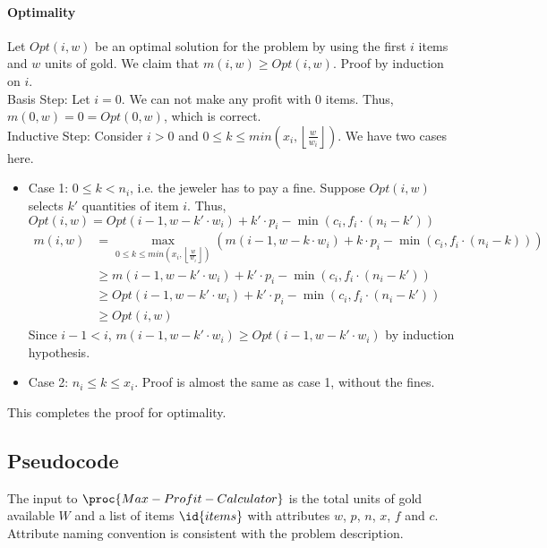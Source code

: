\documentclass{article}
\begin{document}
\paragraph{Optimality}
Let $Opt(i, w)$ be an optimal solution for the problem by using the first $i$ items and $w$ units of gold. We claim that $m(i, w) \geq Opt(i, w)$. Proof by induction on $i$.\\
Basis Step: Let $i = 0$. We can not make any profit with 0 items. Thus, $m(0, w) = 0 = Opt(0, w)$, which is correct.\\
Inductive Step: Consider $i > 0$ and $0 \leq k \leq min\left(x_i, \left\lfloor\frac{w}{w_i}\right\rfloor\right)$. We have two cases here.
\begin{itemize}
	\item Case 1: $0 \leq k < n_i$, i.e. the jeweler has to pay a fine. Suppose $Opt(i, w)$ selects $k'$ quantities of item $i$. Thus, $Opt(i, w) = Opt(i-1, w-k' \cdot w_i) + k' \cdot p_i - \min(c_i, f_i \cdot(n_i - k'))$
	\begin{align*}
	m(i, w) &= \max\limits_{0 \leq k \leq min\left(x_i, \left\lfloor\frac{w}{w_i}\right\rfloor\right)}(m(i-1, w-k \cdot w_i) + k \cdot p_i - \min(c_i, f_i \cdot(n_i - k)))\\
	& \geq  m(i-1, w-k' \cdot w_i) + k' \cdot p_i - \min(c_i, f_i \cdot(n_i - k'))\\
	& \geq Opt(i-1, w-k' \cdot w_i) + k' \cdot p_i - \min(c_i, f_i \cdot(n_i - k'))\\
	& \geq Opt(i, w)
	\end{align*}
	Since $i-1 < i$, $m(i-1,w-k' \cdot w_i) \geq Opt(i-1,w-k' \cdot w_i)$ by induction hypothesis.
	
	\item Case 2: $n_i \leq k \leq x_i$. Proof is almost the same as case 1, without the fines.
\end{itemize}

This completes the proof for optimality.

\subsection{Pseudocode}

The input to $\proc{Max-Profit-Calculator}$ is the total units of gold available $W$ and a list of items $\id{items}$ with attributes $w$, $p$, $n$, $x$, $f$ and $c$. Attribute naming convention is consistent with the problem description.
\end{document}
